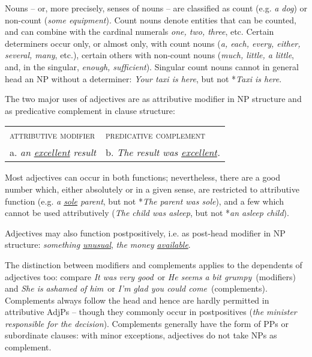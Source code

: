 \newpage

Nouns -- or, more precisely, senses of nouns -- are classified as {count} (e.g. \textit{a dog}) or {non-count} (\textit{some equipment}). Count nouns denote entities that can be counted, and can combine with the cardinal numerals \textit{one, two, three}, etc. Certain determiners occur only, or almost only, with count nouns (\textit{a, each, every, either, several, many}, etc.), certain others with non-count nouns (\textit{much, little, a little}, and, in the singular, \textit{enough, sufficient}). Singular count nouns cannot in general head an NP without a determiner: \textit{Your taxi is here}, but not *\textit{Taxi is here}.


The two major uses of adjectives are as attributive modifier in NP structure and as predicative complement in clause structure:
\begin{examples}
\item \label{ex:26}
    \begin{tabular}{ll}
        \hspace{1em}\textsc{attributive modifier} & \hspace{1em}\textsc{predicative complement}\\
        a. \textit{an \uline{excellent} result} & b. \textit{The result was \uline{excellent}.}
    \end{tabular}
\end{examples}
Most adjectives can occur in both functions; nevertheless, there are a good number which, either absolutely or in a given sense, are restricted to attributive function (e.g. \textit{a \uline{sole} parent}, but not *\textit{The parent was sole}), and a few which cannot be used attributively (\textit{The child was asleep}, but not *\textit{an asleep child}).

Adjectives may also function postpositively, i.e. as post-head modifier in NP structure: \textit{something \uline{unusual}}, \textit{the money \uline{available}}.

The distinction between modifiers and complements applies to the dependents of adjectives too: compare \textit{It was} \ob\textit{very good}\cb\ or \textit{He seems} \ob\textit{a bit grumpy}\cb\ (modifiers) and \textit{She is} \ob\textit{ashamed of him}\cb\ or \textit{I'm} \ob\textit{glad you could come}\cb\ (complements). Complements always follow the head and hence are hardly permitted in attributive AdjPs -- though they commonly occur in postpositives (\textit{the minister} \ob\textit{responsible for the decision}\cb). Complements generally have the form of PPs or subordinate clauses: with minor exceptions, adjectives do not take NPs as complement.

